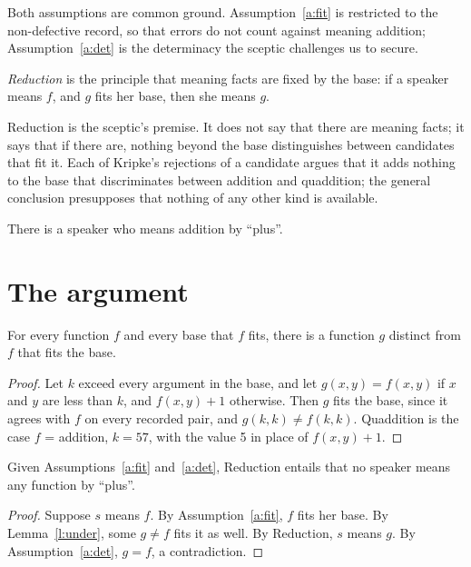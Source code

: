 \documentclass{situationist-preprint}
\begin{document}
Both assumptions are common ground. Assumption~\ref{a:fit} is restricted to the non-defective record, so that errors do not count against meaning addition; Assumption~\ref{a:det} is the determinacy the sceptic challenges us to secure.

\begin{definition}[Reduction]\label{d:red}
\emph{Reduction} is the principle that meaning facts are fixed by the base: if a speaker means $f$, and $g$ fits her base, then she means $g$.
\end{definition}

Reduction is the sceptic's premise. It does not say that there are meaning facts; it says that if there are, nothing beyond the base distinguishes between candidates that fit it. Each of Kripke's rejections of a candidate argues that it adds nothing to the base that discriminates between addition and quaddition; the general conclusion presupposes that nothing of any other kind is available.

\begin{assumption}[Datum]\label{a:datum}
There is a speaker who means addition by \enquote{plus}.
\end{assumption}

\section{The argument}

\begin{lemma}[Underdetermination]\label{l:under}
For every function $f$ and every base that $f$ fits, there is a function $g$ distinct from $f$ that fits the base.
\end{lemma}

\begin{proof}
Let $k$ exceed every argument in the base, and let $g(x,y) = f(x,y)$ if $x$ and $y$ are less than $k$, and $f(x,y)+1$ otherwise. Then $g$ fits the base, since it agrees with $f$ on every recorded pair, and $g(k,k) \neq f(k,k)$. Quaddition is the case $f$ = addition, $k = 57$, with the value 5 in place of $f(x,y) + 1$.
\end{proof}

\begin{theorem}\label{t:valid}
Given Assumptions~\ref{a:fit} and~\ref{a:det}, Reduction entails that no speaker means any function by \enquote{plus}.
\end{theorem}

\begin{proof}
Suppose $s$ means $f$. By Assumption~\ref{a:fit}, $f$ fits her base. By Lemma~\ref{l:under}, some $g \neq f$ fits it as well. By Reduction, $s$ means $g$. By Assumption~\ref{a:det}, $g = f$, a contradiction.
\end{proof}
\end{document}
